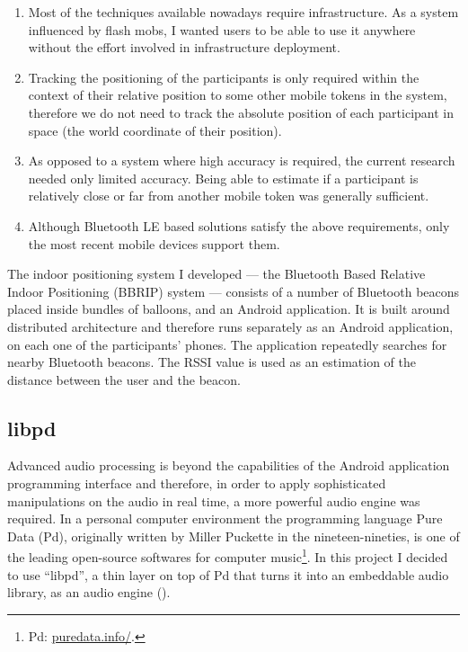\documentclass[a4paper,11pt]{article}
\begin{document}
\begin{enumerate}
	\item Most of the techniques available nowadays require infrastructure.
	As a system influenced by flash mobs, I wanted users to be able to use it anywhere without the effort involved in infrastructure deployment.
	\item Tracking the positioning of the participants is only required within the context of their relative position to some other mobile tokens in the system, therefore we do not need to track the absolute position of each participant in space (the world coordinate of their position).
	\item As opposed to a system where high accuracy is required, the current research needed only limited accuracy.
	Being able to estimate if a participant is relatively close or far from another mobile token was generally sufficient.
	\item Although Bluetooth LE based solutions satisfy the above requirements, only the most recent mobile devices support them.
\end{enumerate}

The indoor positioning system I developed --- the Bluetooth Based Relative Indoor Positioning (BBRIP) system --- consists of a number of Bluetooth beacons placed inside bundles of balloons, and an Android application.
It is built around distributed architecture and therefore runs separately as an Android application, on each one of the participants' phones.
The application repeatedly searches for nearby Bluetooth beacons.
The RSSI value is used as an estimation of the distance between the user and the beacon.

\subsection{libpd}\label{methods:libpd}

Advanced audio processing is beyond the capabilities of the Android application programming interface and therefore, in order to apply sophisticated manipulations on the audio in real time, a more powerful audio engine was required.
In a personal computer environment the programming language Pure Data (Pd), originally written by Miller Puckette in the nineteen-nineties, is one of the leading open-source softwares for computer music\footnote{Pd: \href{http://puredata.info/}{puredata.info/}.}.
In this project I decided to use ``libpd'', a thin layer on top of Pd that turns it into an embeddable audio library, as an audio engine (\cite[p. v]{brinkmann12}).
\end{document}
